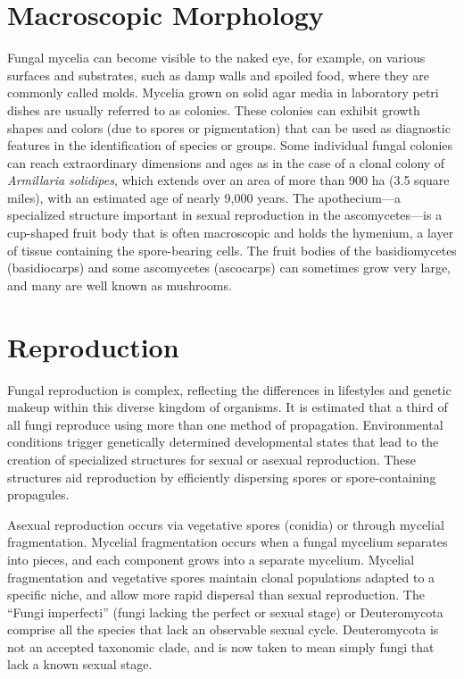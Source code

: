 \documentclass[]{book}
\theoremstyle{definition}
\theoremstyle{definition}
\theoremstyle{definition}
\theoremstyle{remark}
\begin{document}
\section{Macroscopic Morphology}\label{macroscopic-morphology}

Fungal mycelia can become visible to the naked eye, for example, on
various surfaces and substrates, such as damp walls and spoiled food,
where they are commonly called molds. Mycelia grown on solid agar media
in laboratory petri dishes are usually referred to as colonies. These
colonies can exhibit growth shapes and colors (due to spores or
pigmentation) that can be used as diagnostic features in the
identification of species or groups. Some individual fungal colonies can
reach extraordinary dimensions and ages as in the case of a clonal
colony of \emph{Armillaria solidipes}, which extends over an area of more than
900 ha (3.5 square miles), with an estimated age of nearly 9,000 years.
The apothecium---a specialized structure important in sexual
reproduction in the ascomycetes---is a cup-shaped fruit body that is
often macroscopic and holds the hymenium, a layer of tissue containing
the spore-bearing cells. The fruit bodies of the basidiomycetes
(basidiocarps) and some ascomycetes (ascocarps) can sometimes grow very
large, and many are well known as mushrooms.

\section{Reproduction}\label{reproduction}

Fungal reproduction is complex, reflecting the differences in lifestyles
and genetic makeup within this diverse kingdom of organisms. It is
estimated that a third of all fungi reproduce using more than one method
of propagation. Environmental conditions trigger genetically determined
developmental states that lead to the creation of specialized structures
for sexual or asexual reproduction. These structures aid reproduction by
efficiently dispersing spores or spore-containing propagules.

Asexual reproduction occurs via vegetative spores (conidia) or through
mycelial fragmentation. Mycelial fragmentation occurs when a fungal
mycelium separates into pieces, and each component grows into a separate
mycelium. Mycelial fragmentation and vegetative spores maintain clonal
populations adapted to a specific niche, and allow more rapid dispersal
than sexual reproduction. The ``Fungi imperfecti'' (fungi lacking the
perfect or sexual stage) or Deuteromycota comprise all the species that
lack an observable sexual cycle. Deuteromycota is not an accepted
taxonomic clade, and is now taken to mean simply fungi that lack a known
sexual stage.
\end{document}
